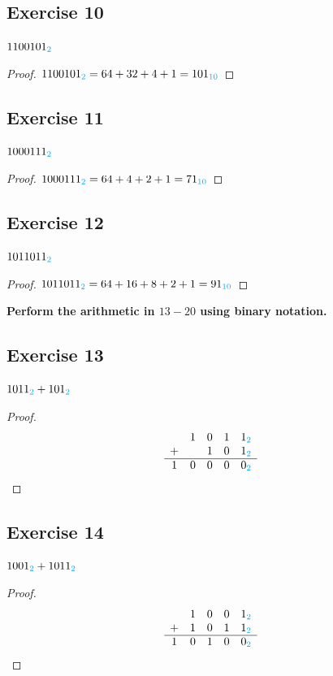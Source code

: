 \documentclass[14pt]{extarticle}
\newcommand{\base}[1]{{\color{cyan}#1}}
\begin{document}
\subsection{Exercise 10} 
$1100101_\base{2}$

\begin{proof} 
$1100101_\base{2} = 64 + 32 + 4 + 1 = 101_\base{10}$ 
\end{proof}

\subsection{Exercise 11} 
$1000111_\base{2}$

\begin{proof} 
$1000111_\base{2} = 64 + 4 + 2 + 1 = 71_\base{10}$ 
\end{proof}

\subsection{Exercise 12} 
$1011011_\base{2}$

\begin{proof} 
$1011011_\base{2} = 64 + 16 + 8 + 2 + 1 = 91_\base{10}$
\end{proof}

{\bf \color{cyan} Perform the arithmetic in $13-20$ using binary notation.}

\subsection{Exercise 13} 
$1011_\base{2} + 101_\base{2}$

\begin{proof} 
$$ 
\begin{array}{ccccc} 
&1&0&1&1_\base{2}\\ +& &1&0&1_\base{2}\\
\hline 
1&0&0&0&0_\base{2}\\ 
\end{array} 
$$ 
\end{proof}

\subsection{Exercise 14} 
$1001_\base{2} + 1011_\base{2}$

\begin{proof} 
$$ 
\begin{array}{ccccc} 
&1&0&0&1_\base{2}\\ 
+&1&0&1&1_\base{2}\\
\hline 
1&0&1&0&0_\base{2}\\ 
\end{array} 
$$ 
\end{proof}
\end{document}
